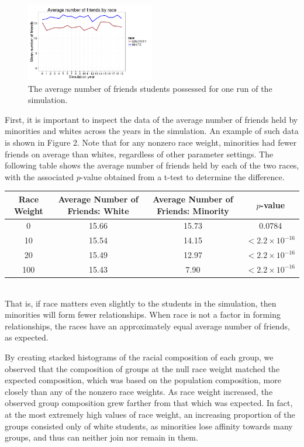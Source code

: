 \begin{figure}[h]
  \centering
    \includegraphics[width=0.5\textwidth]{avgNumberOfFriendsFromCaladan.png}
      \caption{The average number of friends students possessed for one run of the simulation.}
\end{figure}
First, it is important to inspect the data of the average number of friends held by minorities and whites across the years 
in the simulation. An example of such data is shown in Figure 2. Note that for any nonzero race weight, 
minorities had fewer friends on average than whites, regardless of other parameter settings. The following table shows the average 
number of friends held by each of the two races, with the associated $p$-value obtained from a t-test to determine the difference.
\begin{center}
\begin{tabular}{|c|c|c|c|}
\hline
Race Weight & Average Number of Friends: White & Average Number of Friends: Minority & $p$-value\\
\hline
0 & 15.66 & 15.73 & 0.0784\\
10 & 15.54 & 14.15 & $<2.2\times 10^{-16}$\\
20 & 15.49 & 12.97 & $<2.2\times 10^{-16}$\\
100 & 15.43 & 7.90 & $<2.2\times 10^{-16}$\\
\hline
\end{tabular}
\end{center}~~\\

That is, if race matters even slightly to the students in the simulation, then minorities will form fewer relationships. When race is not a factor in 
forming relationships, the races have an approximately equal average number of friends, as expected.

By creating stacked histograms of the racial composition of each group, we observed that the composition of groups at the null 
race weight matched the expected composition, which was based on the population composition, more closely than any of the 
nonzero race weights. As race weight increased, the observed group composition grew farther from that which was expected. In 
fact, at the most extremely high values of race weight, an increasing proportion of the groups consisted only of white 
students, as minorities lose affinity towards many groups, and thus can neither join nor remain in them.

